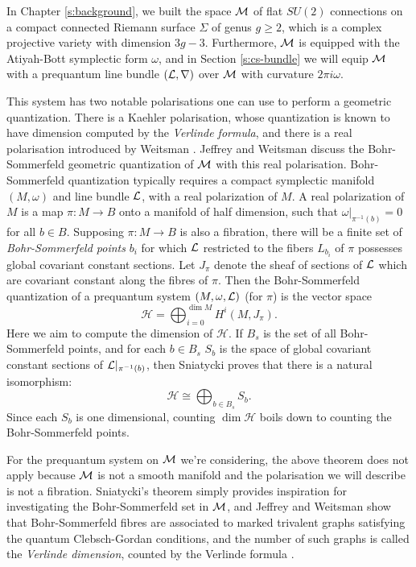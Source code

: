 
	In Chapter \ref{s:background}, we built the space $\mathcal{M}$ of flat $SU(2)$ connections on a compact connected Riemann surface $\Sigma$ of genus $g\geq 2$, which is a complex projective variety with dimension $3g-3$. Furthermore, $\mathcal{M}$ is equipped with the Atiyah-Bott symplectic form $\omega$, and in Section \ref{s:cs-bundle} we will equip $\mathcal{M}$ with a prequantum line bundle $(\mathcal{L},\nabla)$ over $\mathcal{M}$ with curvature $2\pi i \omega$.
	
	This system has two notable polarisations one can use to perform a geometric quantization. There is a Kaehler polarisation, whose quantization is known to have dimension computed by the \emph{Verlinde formula}, and there is a real polarisation introduced by Weitsman \cite{weitsman_real_1992}. Jeffrey and Weitsman discuss the Bohr-Sommerfeld geometric quantization of $\mathcal{M}$ with this real polarisation. Bohr-Sommerfeld quantization typically requires a compact symplectic manifold $(M,\omega)$ and line bundle $\mathcal{L}$, with a real polarization of $M$. A real polarization of $M$ is a map $\pi:M\to B$ onto a manifold of half dimension, such that $\omega|_{\pi^{-1}(b)} =0$ for all $b\in B$. Supposing $\pi:M\to B$ is also a fibration, there will be a finite set of \textit{Bohr-Sommerfeld points} $b_i$ for which $\mathcal{L}$ restricted to the fibers $L_{b_i}$ of $\pi$ possesses global covariant constant sections. Let $J_\pi$ denote the sheaf of sections of $\mathcal{L}$ which are covariant constant along the fibres of $\pi$. Then the Bohr-Sommerfeld quantization of a prequantum system $(M,\omega,\mathcal{L})$ (for $\pi$) is the vector space
	\begin{equation}
		\mathcal{H} = \bigoplus_{i=0}^{\dim M} H^i(M,J_\pi).
	\end{equation}
	Here we aim to compute the dimension of $\mathcal{H}$. If $B_s$ is the set of all Bohr-Sommerfeld points, and for each $b\in B_s$ $S_b$ is the space of global covariant constant sections of $\mathcal{L}|_{\pi^{-1}(b)}$, then Sniatycki \cite{sniatycki_cohomology_1977} proves that there is a natural isomorphism:
	\begin{equation}
		\mathcal{H} \cong \bigoplus_{b\in B_s} S_b.
	\end{equation}
	Since each $S_b$ is one dimensional, counting $\dim \mathcal{H}$ boils down to counting the Bohr-Sommerfeld points. 
	
	For the prequantum system on $\mathcal{M}$ we're considering, the above theorem does not apply because $\mathcal{M}$ is not a smooth manifold and the polarisation we will describe is not a fibration. Sniatycki's theorem simply provides inspiration for investigating the Bohr-Sommerfeld set in $\mathcal{M}$, and Jeffrey and Weitsman show that Bohr-Sommerfeld fibres are associated to marked trivalent graphs satisfying the quantum Clebsch-Gordan conditions, and the number of such graphs is called the \emph{Verlinde dimension}, counted by the Verlinde formula \cite[Thm. 8.1]{jeffrey_bohr-sommerfeld_1992}.
	
